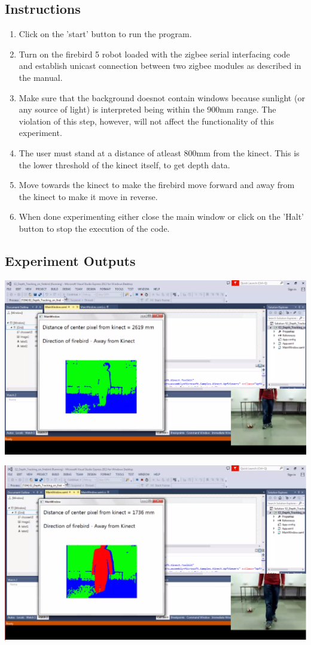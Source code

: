 \begin{flushleft}
\subsection{\textbf{ Instructions}}
\begin{enumerate}
\item Click on the 'start' button to run the program.
\item Turn on the firebird 5 robot loaded with the zigbee serial interfacing code and establish unicast connection between two zigbee modules as described in the manual.
\item Make sure that the background doesnot contain windows because sunlight (or any source of light) is interpreted being within the 900mm range. The violation of this step, however, will not affect the functionality of this experiment.
\item The user must stand at a distance of atleast 800mm from the kinect. This is the lower threshold of the kinect itself, to get depth data.
\item Move towards the kinect to make the firebird move forward and away from the kinect to make it move in reverse.
\item When done experimenting either close the main window or click on the 'Halt' button to stop the execution of the code.
\end{enumerate}

\medskip
\subsection{\textbf{ Experiment Outputs}}
\includegraphics[scale = 0.5]{e21}

\medskip
\includegraphics[scale = 0.5]{e22}
\medskip

\end{flushleft}

